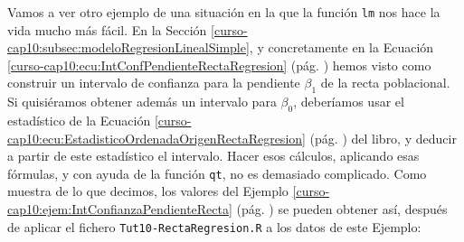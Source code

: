 \documentclass[10pt,a4paper]{article}\usepackage[]{graphicx}\usepackage[]{color}
\begin{document}
Vamos a ver otro ejemplo de una situación en la que la función {\tt lm} nos hace la vida mucho más fácil. En la Sección \ref{curso-cap10:subsec:modeloRegresionLinealSimple}, y concretamente en la Ecuación \ref{curso-cap10:ecu:IntConfPendienteRectaRegresion} (pág. \pageref{curso-cap10:ecu:IntConfPendienteRectaRegresion}) hemos visto como construir un intervalo de confianza para la pendiente $\beta_1$ de la recta poblacional. Si quisiéramos obtener además un intervalo para $\beta_0$, deberíamos usar el estadístico de la Ecuación \ref{curso-cap10:ecu:EstadisticoOrdenadaOrigenRectaRegresion} (pág. \pageref{curso-cap10:ecu:EstadisticoOrdenadaOrigenRectaRegresion}) del libro, y deducir a partir de este estadístico el intervalo. Hacer esos cálculos, aplicando esas fórmulas, y con ayuda de la función {\tt qt}, no es demasiado complicado. Como muestra de lo que decimos, los valores del Ejemplo \ref{curso-cap10:ejem:IntConfianzaPendienteRecta} (pág. \pageref{curso-cap10:ejem:IntConfianzaPendienteRecta}) se pueden obtener así, después de aplicar el fichero {\tt Tut10-RectaRegresion.R} a los datos de este Ejemplo:
\end{document}

